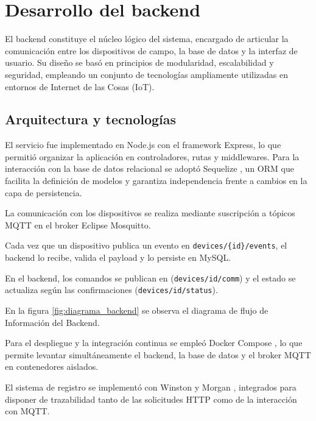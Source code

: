\section{Desarrollo del backend}

El backend constituye el núcleo lógico del sistema, encargado de articular la comunicación entre los dispositivos de campo, la base de datos y la interfaz de usuario. Su diseño se basó en principios de modularidad, escalabilidad y seguridad, empleando un conjunto de tecnologías ampliamente utilizadas en entornos de Internet de las Cosas (IoT).


\subsection{Arquitectura y tecnologías}

El servicio fue implementado en Node.js con el framework Express, lo que permitió organizar la aplicación en controladores, rutas y middlewares. Para la interacción con la base de datos relacional se adoptó Sequelize \cite{sequelize}, un ORM \cite{fowler2002patterns} que facilita la definición de modelos y garantiza independencia frente a cambios en la capa de persistencia.

La comunicación con los dispositivos se realiza mediante suscripción a tópicos MQTT en el broker Eclipse Mosquitto. 

Cada vez que un dispositivo publica un evento en \texttt{devices/\{id\}/events}, 
el backend lo recibe, valida el payload y lo persiste en MySQL.
 
En el backend, los comandos se publican en (\texttt{devices/{id}/comm}) y el estado se actualiza según las confirmaciones (\texttt{devices/{id}/status}). 

En la figura \ref{fig:diagrama_backend} se observa el diagrama de flujo de Información del Backend.



Para el despliegue y la integración continua se empleó Docker Compose \cite{docker_compose}, lo que permite levantar simultáneamente el backend, la base de datos y el broker MQTT \cite{mqttSpec} en contenedores aislados.

El sistema de registro se implementó con Winston  \cite{winston} y Morgan \cite{morgan}, integrados para disponer de trazabilidad tanto de las solicitudes HTTP como de la interacción con MQTT.

